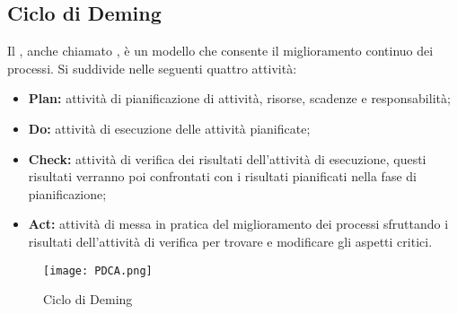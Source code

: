 \documentclass{scalatekids-article}
\begin{document}
\subsection{Ciclo di Deming}
\label{PDCA}
Il , anche chiamato , è un modello che consente il miglioramento continuo dei processi. Si suddivide nelle seguenti quattro attività:
\begin{itemize}
  \item{\textbf{Plan:} attività di pianificazione di attività, risorse, scadenze e responsabilità;}
  \item{\textbf{Do:} attività di esecuzione delle attività pianificate;}
  \item{\textbf{Check:} attività di verifica dei risultati dell'attività di esecuzione, questi risultati verranno poi confrontati con i risultati pianificati nella fase di pianificazione;}
  \item{\textbf{Act:} attività di messa in pratica del miglioramento dei processi sfruttando i risultati dell'attività di verifica per trovare e modificare gli aspetti critici.}
\end{itemize}
\begin{figure}[H]
  \begin{center}
    \texttt{[image: PDCA.png]}
    \caption{Ciclo di Deming}
  \end{center}
\end{figure}
\end{document}
